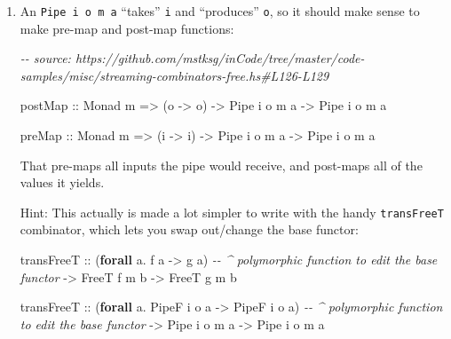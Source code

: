 \documentclass[]{article}
\newenvironment{Shaded}{}{}
\newcommand{\CommentTok}[1]{\textcolor[rgb]{0.38,0.63,0.69}{\textit{#1}}}
\newcommand{\DataTypeTok}[1]{\textcolor[rgb]{0.56,0.13,0.00}{#1}}
\newcommand{\KeywordTok}[1]{\textcolor[rgb]{0.00,0.44,0.13}{\textbf{#1}}}
\newcommand{\NormalTok}[1]{#1}
\newcommand{\OperatorTok}[1]{\textcolor[rgb]{0.40,0.40,0.40}{#1}}
\newcommand{\OtherTok}[1]{\textcolor[rgb]{0.00,0.44,0.13}{#1}}
\begin{document}
\begin{enumerate}
\def\labelenumi{\arabic{enumi}.}
\item
  An \texttt{Pipe\ i\ o\ m\ a} ``takes'' \texttt{i} and ``produces'' \texttt{o},
  so it should make sense to make pre-map and post-map functions:

\begin{Shaded}
\begin{Highlighting}[]
\CommentTok{{-}{-} source: https://github.com/mstksg/inCode/tree/master/code{-}samples/misc/streaming{-}combinators{-}free.hs\#L126{-}L129}

\OtherTok{postMap ::} \DataTypeTok{Monad}\NormalTok{ m }\OtherTok{=>}\NormalTok{ (o }\OtherTok{{-}>}\NormalTok{ o\textquotesingle{}) }\OtherTok{{-}>} \DataTypeTok{Pipe}\NormalTok{ i o m a }\OtherTok{{-}>} \DataTypeTok{Pipe}\NormalTok{ i o\textquotesingle{} m a}

\OtherTok{preMap ::} \DataTypeTok{Monad}\NormalTok{ m }\OtherTok{=>}\NormalTok{ (i\textquotesingle{} }\OtherTok{{-}>}\NormalTok{ i) }\OtherTok{{-}>} \DataTypeTok{Pipe}\NormalTok{ i o m a }\OtherTok{{-}>} \DataTypeTok{Pipe}\NormalTok{ i\textquotesingle{} o m a}
\end{Highlighting}
\end{Shaded}

  That pre-maps all inputs the pipe would receive, and post-maps all of the
  values it yields.

  Hint: This actually is made a lot simpler to write with the handy
  \texttt{transFreeT} combinator, which lets you swap out/change the base
  functor:

\begin{Shaded}
\begin{Highlighting}[]
\NormalTok{transFreeT}
\OtherTok{    ::}\NormalTok{ (}\KeywordTok{forall}\NormalTok{ a}\OperatorTok{.}\NormalTok{ f a }\OtherTok{{-}>}\NormalTok{ g a)     }\CommentTok{{-}{-} \^{} polymorphic function to edit the base functor}
    \OtherTok{{-}>} \DataTypeTok{FreeT}\NormalTok{ f m b}
    \OtherTok{{-}>} \DataTypeTok{FreeT}\NormalTok{ g m b}

\NormalTok{transFreeT}
\OtherTok{    ::}\NormalTok{ (}\KeywordTok{forall}\NormalTok{ a}\OperatorTok{.} \DataTypeTok{PipeF}\NormalTok{ i o a }\OtherTok{{-}>} \DataTypeTok{PipeF}\NormalTok{ i\textquotesingle{} o\textquotesingle{} a)  }\CommentTok{{-}{-} \^{} polymorphic function to edit the base functor}
    \OtherTok{{-}>} \DataTypeTok{Pipe}\NormalTok{ i  o  m a}
    \OtherTok{{-}>} \DataTypeTok{Pipe}\NormalTok{ i\textquotesingle{} o\textquotesingle{} m a}
\end{Highlighting}
\end{Shaded}


\end{enumerate}
\end{document}
